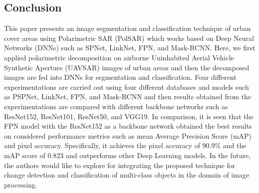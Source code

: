 \documentclass[a4paper,12pt]{spieman}  %
\begin{document}
\begin{spacing}{1}
\section{Conclusion}
This paper presents an image segmentation and classification technique of urban cover areas using Polarimetric SAR (PolSAR) which works based on Deep Neural Networks (DNNs) such as SPNet, LinkNet, FPN, and Mask-RCNN. Here, we first applied polarimetric decomposition on airborne Uninhabited Aerial Vehicle Synthetic Aperture (UAVSAR) images of urban areas and then the decomposed images are fed into DNNs for segmentation and classification. Four different experimentations are carried out using four different databases and models such as PSPNet, LinkNet, FPN, and Mask-RCNN and then results obtained from the experimentations are compared with different backbone networks such as ResNet152, ResNet101, ResNet50, and VGG19. In comparison, it is seen that the FPN model with the ResNet152 as a backbone network obtained the best results on considered performance metrics such as mean Average Precision Score (mAP) and pixel accuracy. Specifically, it achieves the pixel accuracy of 90.9\% and the mAP score of 0.823 and outperforms other Deep Learning models. In the future, the authors would like to explore for integrating the proposed technique for change detection and classification of multi-class objects in the domain of image processing.
%

\end{spacing}
\end{document}
